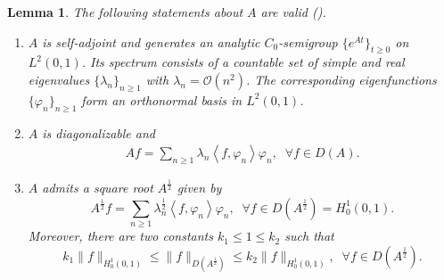 \documentclass[review]{elsarticle}
\newtheorem{lemma}[theorem]{Lemma}
\numberwithin{equation}{section}
\begin{document}
\begin{lemma}
\label{A-property}
    The following statements about $A$ are valid (\cite[Chapter 2 and Chapter 3]{TW}).
\begin{enumerate}
\item[(i)]
${A}$ is self-adjoint and generates an analytic $C_0$-semigroup $\{e^{{A}t}\}_{t\ge 0}$ on $L^2(0,1)$. Its spectrum consists of a countable set of simple and real eigenvalues $\{\lambda_n\}_{n\geq 1}$ with $\lambda_n = \mathcal{O}(n^2)$. The corresponding eigenfunctions $\{\varphi_n\}_{n\ge 1}$ form an orthonormal basis in $L^2(0,1)$. 
        \item[(ii)] $A$ is diagonalizable and 
        \begin{equation*}\label{express3}
            \begin{aligned}
                Af=\sum_{n\ge 1}\lambda_n\left\langle f,\varphi_n \right\rangle\varphi_n,\;\; \forall f \in D(A).
            \end{aligned}
        \end{equation*}

\item[(iii)] ${A}$ admits a square root ${A}^{\frac{1}{2}}$ given by
\begin{equation*}\label{express4}
                {A}^{\frac{1}{2}}f=\sum_{n\ge 1}\lambda_n^{\frac{1}{2}}\left\langle f,\varphi_n \right\rangle\varphi_n,\;\; \forall  f \in D({A}^{\frac{1}{2}})=H^1_0(0,1).
        \end{equation*}
        {Moreover, there are two constants  $k_1\le 1\le k_2$ such that 
        \begin{equation*}
        k_1\|f\|_{H^1_0(0,1)} \le \|f\|_{D(A^{\frac{1}{2}})} \le k_2\|f\|_{H^1_0(0,1)},\;\; \forall f\in D(A^{\frac{1}{2}}).
        \end{equation*}
    }
\end{enumerate}
\end{lemma}
\end{document}
